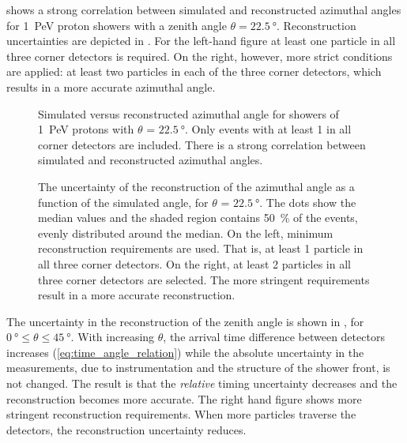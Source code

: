  shows a strong correlation between simulated and
reconstructed azimuthal angles for \SI{1}{\peta\electronvolt} proton showers
with a zenith angle $\theta = \SI{22.5}{\degree}$.
Reconstruction uncertainties are depicted in
.  For the left-hand figure at least one
particle in all three corner detectors is required.
On the right, however, more strict conditions are applied: at least two
particles in each of the three corner detectors, which results in a more
accurate azimuthal angle.

\begin{figure}
\centering
\longprocess{}
\caption{Simulated versus reconstructed azimuthal angle for showers of
\SI{1}{\peta\electronvolt} protons with $\theta$ = $\SI{22.5}{\degree}$.
Only events with at least \SI{1}{\mip} in all corner detectors are
included.  There is a strong correlation between simulated and
reconstructed azimuthal angles.}
\label{fig:phi-reconstruction}
\end{figure}

\begin{figure}
\centering
{


}
\caption{The uncertainty of the reconstruction of the azimuthal angle as a
function of the simulated angle, for $\theta$ = $\SI{22.5}{\degree}$.  The
dots show the median values and the shaded region contains
\SI{50}{\percent} of the events, evenly distributed around the median. On
the left, minimum reconstruction requirements are used.  That is, at least
1 particle in all three corner detectors.  On the right, at least 2
particles in all three corner detectors are selected.  The more stringent
requirements result in a more accurate reconstruction.}
\label{fig:phi-reconstruction-error}
\end{figure}

The uncertainty in the reconstruction of the zenith angle is shown in
, for $\SI{0}{\degree} \leq \theta \leq
\SI{45}{\degree}$.
With increasing $\theta$, the arrival time difference between detectors
increases (\eqref{eq:time_angle_relation}) while the absolute uncertainty in the
measurements, due to instrumentation and the structure of the shower front, is
not changed. The result is that the \emph{relative} timing uncertainty decreases
and the reconstruction becomes more accurate.
The right hand figure shows more stringent reconstruction requirements. When
more particles traverse the detectors, the reconstruction uncertainty reduces.

